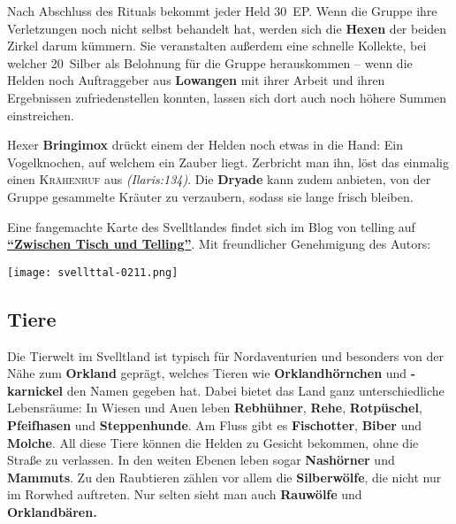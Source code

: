 \vfill


Nach Abschluss des Rituals bekommt jeder Held 30~EP.
Wenn die Gruppe ihre Verletzungen noch nicht selbst behandelt hat, werden sich die \textbf{Hexen} der beiden Zirkel darum kümmern.
Sie veranstalten außerdem eine schnelle Kollekte, bei welcher 20~Silber als Belohnung für die Gruppe herauskommen -- wenn die Helden noch Auftraggeber aus \textbf{Lowangen} mit ihrer Arbeit und ihren Ergebnissen zufriedenstellen konnten, lassen sich dort auch noch höhere Summen einstreichen. 

Hexer \textbf{Bringimox} drückt einem der Helden noch etwas in die Hand:
Ein Vogelknochen, auf welchem ein Zauber liegt. Zerbricht man ihn, löst das einmalig einen \textsc{Krähenruf} aus \emph{(Ilaris:134)}.
Die \textbf{Dryade} kann zudem anbieten, von der Gruppe gesammelte Kräuter zu verzaubern, sodass sie lange frisch bleiben.

\neueseite

\spaltenende
Eine fangemachte Karte des Svelltlandes findet sich im Blog von telling auf \href{https://tellingaventurien.home.blog/2023/02/27/karte-svelltland-um-1045-nach-bosparans-fall/}{\textbf{\enquote{Zwischen Tisch und Telling}}}. Mit freundlicher Genehmigung des Autors:

\begin{center}
\texttt{[image: svellttal-0211.png]}
\end{center}

\newpage

\spaltenanfang



\subsection[Tiere und Pflanzen]{Tiere}
\label{svellt}
Die Tierwelt im Svelltland ist typisch für Nordaventurien und besonders von der Nähe zum \textbf{Orkland} geprägt,
welches Tieren wie \textbf{Orklandhörnchen} und \textbf{-karnickel} den Namen gegeben hat.
Dabei bietet das Land ganz unterschiedliche Lebensräume:
In Wiesen und Auen leben \textbf{Rebhühner}, \textbf{Rehe}, \textbf{Rotpüschel}, \textbf{Pfeifhasen} und \textbf{Steppenhunde}.
Am Fluss gibt es \textbf{Fischotter}, \textbf{Biber} und \textbf{Molche}. All diese Tiere können die Helden zu Gesicht bekommen, ohne die Straße zu verlassen. In den weiten Ebenen leben sogar \textbf{Nashörner} und \textbf{Mammuts}.
Zu den Raubtieren zählen vor allem die \textbf{Silberwölfe}, die nicht nur im Rorwhed auftreten. Nur selten sieht man auch \textbf{Rauwölfe} und \textbf{Orklandbären.}

